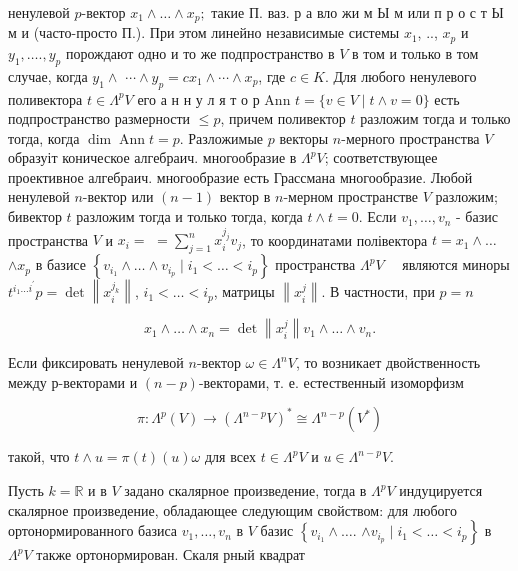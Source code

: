 \documentclass[10pt]{article}
\begin{document}
ненулевой $p$-вектор $x_{1} \wedge \ldots \wedge x_{p} ;$ такие П. ваз. р а вло жи м Ы м или п р о с т Ы м и (часто-просто П.). При этом линейно независимые системы $x_{1}$, .., $x_{p}$ и $y_{1}, \ldots ., y_{p}$ порождают одно и то же подпространство в $V$ в том и только в том случае, когда $y_{1} \wedge$ $\cdots \wedge y_{p}=c x_{1} \wedge \cdots \wedge x_{p}$, где $c \in K$. Для любого ненулевого поливектора $t \in \Lambda^{p} V$ его а н н у л я т о р Ann $t=\{v \in V \mid t \wedge v=0\}$ есть подпространство размерности $\leqslant p$, причем поливектор $t$ разложим тогда и только тогда, когда $\operatorname{dim} \operatorname{Ann} t=p$. Разложимые $p$ векторы $n$-мерного пространства $V$ образуіт коническое алгебраич. многообразие в $\Lambda^{p} V$; соответствующее проективное алгебраич. многообразие есть Грассмана многообразие. Любой ненулевой $n$-вектор или $(n-1)$ вектор в $n$-мерном пространстве $V$ разложим; бивектор $t$ разложим тогда и только тогда, когда $t \wedge t=0$. Если $v_{1}, \ldots, v_{n}$ - базис пространства $V$ и $x_{i}=$ $=\sum_{j=1}^{n} x_{i}^{j_{j}} v_{j}$, то координатами полівектора $t=x_{1} \wedge \ldots$ $\wedge x_{p}$ в базисе $\left\{v_{i_{1}} \wedge \ldots \wedge v_{i_{p}} \mid i_{1}<\ldots<i_{p}\right\}$ пространства $\Lambda^{p} V \quad$ являются миноры $t^{i_{1} \ldots i^{\prime}} p=\operatorname{det}\left\|x_{i}^{j_{k}}\right\|$, $i_{1}<\ldots<i_{p}$, матрицы $\left\|x_{i}^{j}\right\|$. В частности, при $p=n$



\[

x_{1} \wedge \ldots \wedge x_{n}=\operatorname{det}\left\|x_{i}^{j}\right\| v_{1} \wedge \ldots \wedge v_{n} .

\]



Если фиксировать ненулевой $n$-вектор $\omega \in \Lambda^{n} V$, то возникает двойственность между р-векторами и $(n-p)$-векторами, т. е. естественный изоморфизм



\[

\pi: \Lambda^{p}(V) \longrightarrow\left(\Lambda^{n-p} V\right)^{*} \cong \Lambda^{n-p}\left(V^{*}\right)

\]



такой, что $t \wedge u=\pi(t)(u) \omega$ для всех $t \in \Lambda^{p} V$ и $u \in \Lambda^{n-p} V$.



Пусть $k=\mathbb{R}$ и в $V$ задано скалярное произведение, тогда в $\Lambda^{p} V$ индуцируется скалярное произведение, обладающее следующим свойством: для любого ортонормированного базиса $v_{1}, \ldots, v_{n}$ в $V$ базис $\left\{v_{i_{1}} \wedge \ldots\right.$. $\left.\wedge v_{i_{p}} \mid i_{1}<\ldots<i_{p}\right\}$ в $\Lambda^{p} V$ также ортонормирован. Скаля рный квадрат
\end{document}
